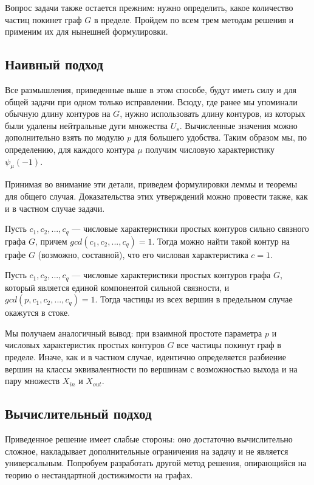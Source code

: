Вопрос задачи также остается прежним: нужно определить, какое количество частиц покинет граф $G$ в пределе. Пройдем по всем трем методам решения и применим их для нынешней формулировки. 

\subsection{Наивный подход}

Все размышления, приведенные выше в этом способе, будут иметь силу и для общей задачи при одном только исправлении. Всюду, где ранее мы упоминали обычную длину контуров на $G$, нужно использовать длину контуров, из которых были удалены нейтральные дуги множества $U_s$. Вычисленные значения можно дополнительно взять по модулю $p$ для большего удобства. Таким образом мы, по определению, для каждого контура $\mu$ получим числовую характеристику $\psi_\mu(-1)$. 

Принимая во внимание эти детали, приведем формулировки леммы и теоремы для общего случая. Доказательства этих утверждений можно провести также, как и в частном случае задачи. 

\begin{lemma}
	Пусть $c_1, c_2, ... , c_q$ --- числовые характеристики простых контуров сильно связного графа $G$, причем $gcd(c_1, c_2, ... , c_q) = 1$. Тогда можно найти такой контур на графе $G$ (возможно, составной), что его числовая характеристика $c = 1$.
\end{lemma}

\begin{theorem}
	Пусть $c_1, c_2, ... , c_q $ --- числовые характеристики простых контуров графа $G$, который является единой компонентой сильной связности, и $gcd(p, c_1, c_2, ... , c_q) = 1$. Тогда частицы из всех вершин в предельном случае окажутся в стоке.
\end{theorem}

Мы получаем аналогичный вывод: при взаимной простоте параметра $p$ и  числовых характеристик простых контуров $G$ все частицы покинут граф в пределе. Иначе, как и в частном случае, идентично определяется разбиение вершин на классы эквивалентности по вершинам с возможностью выхода и на пару множеств $X_{in}$ и $X_{out}$. 

\subsection{Вычислительный подход}

Приведенное решение имеет слабые стороны: оно достаточно вычислительно сложное, накладывает дополнительные ограничения на задачу и не является универсальным. Попробуем разработать другой метод решения, опирающийся на теорию о нестандартной достижимости на графах. 

